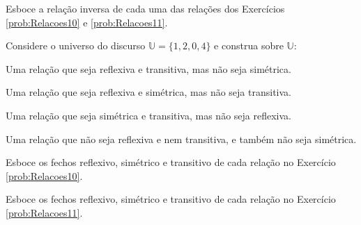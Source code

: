 \begin{problem}\label{prob:Relacoes12}
	Esboce a relação inversa de cada uma das relações dos Exercícios \ref{prob:Relacoes10} e \ref{prob:Relacoes11}.
\end{problem}

\begin{problem}\label{prob:Relacoes13}
	Considere o universo do discurso $\mathbb{U} = \{1, 2, 0, 4\}$ e construa sobre $\mathbb{U}$:
\end{problem}

\begin{exerList}
	\item Uma relação que seja reflexiva e transitiva, mas não seja simétrica.
	\item Uma relação que seja reflexiva e simétrica, mas não seja transitiva.
	\item Uma relação que seja simétrica e transitiva, mas não seja reflexiva.
	\item Uma relação que não seja reflexiva e nem  transitiva, e também não seja simétrica.
\end{exerList}

\begin{problem}\label{prob:Relacoes14}
	Esboce os fechos reflexivo, simétrico e transitivo de cada relação no Exercício \ref{prob:Relacoes10}.
\end{problem}

\begin{problem}\label{prob:Relacoes15}
	Esboce os fechos reflexivo, simétrico e transitivo de cada relação no Exercício \ref{prob:Relacoes11}.
\end{problem}